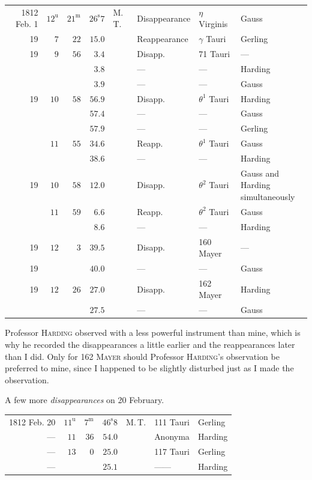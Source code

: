 \begin{center}\fontsize{9}{11}\selectfont\setlength{\tabcolsep}{1.8pt}\renewcommand{\arraystretch}{1.15}\begin{tabular}{rrrrllll}
1812 Feb. 1 & $12^{\mathrm u}$ & $21^{\mathrm m}$ & $26^{\mathrm s}7$ & M.\,T. & Disappearance & $\eta$ Virginis & Gauss\\
19 & $7$ & $22$ & $15.0$ &  & Reappearance & $\gamma$ Tauri & Gerling\\
19 & $9$ & $56$ & $3.4$ &  & Disapp. & 71 Tauri & —\\
 &  &  & $3.8$ &  & — & — & Harding\\
 &  &  & $3.9$ &  & — & — & Gauss\\
19 & $10$ & $58$ & $56.9$ &  & Disapp. & $\theta^1$ Tauri & Harding\\
 &  &  & $57.4$ &  & — & — & Gauss\\
 &  &  & $57.9$ &  & — & — & Gerling\\
 & $11$ & $55$ & $34.6$ &  & Reapp. & $\theta^1$ Tauri & Gauss\\
 &  &  & $38.6$ &  & — & — & Harding\\
19 & $10$ & $58$ & $12.0$ &  & Disapp. & $\theta^2$ Tauri & \parbox[t]{92pt}{\raggedright Gauss and Harding\\simultaneously}\\
 & $11$ & $59$ & $6.6$ &  & Reapp. & $\theta^2$ Tauri & Gauss\\
 &  &  & $8.6$ &  & — & — & Harding\\
19 & $12$ & $3$ & $39.5$ &  & Disapp. & 160 Mayer & —\\
19 &  &  & $40.0$ &  & — & — & Gauss\\
19 & $12$ & $26$ & $27.0$ &  & Disapp. & 162 Mayer & Harding\\
 &  &  & $27.5$ &  & — & — & Gauss\\
\end{tabular}\end{center}

\par\indent Professor \textsc{Harding} observed with a less powerful instrument than mine, which is why he recorded the disappearances a little earlier and the reappearances later than I did. Only for 162 \textsc{Mayer} should Professor \textsc{Harding}’s observation be preferred to mine, since I happened to be slightly disturbed just as I made the observation.
\par\indent A few more \emph{disappearances} on 20 February.

\begin{center}\fontsize{10}{12}\selectfont\setlength{\tabcolsep}{3pt}\renewcommand{\arraystretch}{1.15}\begin{tabular}{rrrrlll}
1812 Feb. 20 & $11^{\mathrm u}$ & $7^{\mathrm m}$ & $46^{\mathrm s}8$ & M.\,T. & 111 Tauri & Gerling\\
— & $11$ & $36$ & $54.0$ &  & Anonyma & Harding\\
— & $13$ & $0$ & $25.0$ &  & 117 Tauri & Gerling\\
— &  &  & $25.1$ &  & —\quad — & Harding\\
\end{tabular}\end{center}
